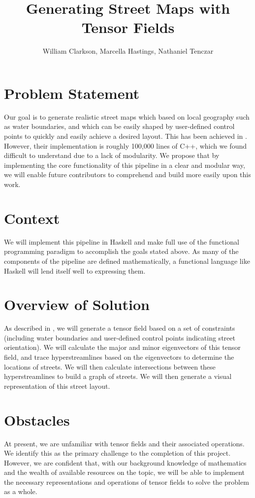 \documentclass{proc}
\begin{document}
    
\title{Generating Street Maps with Tensor Fields}
\author{William Clarkson, Marcella Hastings, Nathaniel Tenczar}

\maketitle

\section{Problem Statement}
Our goal is to generate realistic street maps which based on local geography
such as water boundaries, and which can be easily shaped by user-defined
control points to quickly and easily achieve a desired layout. This has been
achieved in \cite{wonka}. However, their implementation is roughly 100,000
lines of C++, which we found difficult to understand due to a lack
of modularity. We propose that by implementing the core functionality of this
pipeline in a clear and modular way, we will enable future contributors
to comprehend and build more easily upon this work.

\section{Context}
We will implement this pipeline in Haskell and make full use of the functional
programming paradigm to accomplish the goals stated above. As many of the
components of the pipeline are defined mathematically, a functional
language like Haskell will lend itself well to expressing them.

\section{Overview of Solution}
As described in \cite{wonka}, we will generate a tensor field based on a set
of constraints (including water boundaries and user-defined control points
indicating street orientation). We will calculate the major and minor
eigenvectors of this tensor field, and trace hyperstreamlines based on
the eigenvectors to determine the locations of streets. We will then calculate
intersections between these hyperstreamlines to build a graph of streets. We
will then generate a visual representation of this street layout.

\section{Obstacles}
At present, we are unfamiliar with tensor fields and their associated
operations. We identify this as the primary challenge to the completion of this
project. However, we are confident that, with our background knowledge of
mathematics and the wealth of available resources on the topic, we will be able
to implement the necessary representations and operations of tensor fields to
solve the problem as a whole.
\end{document}
